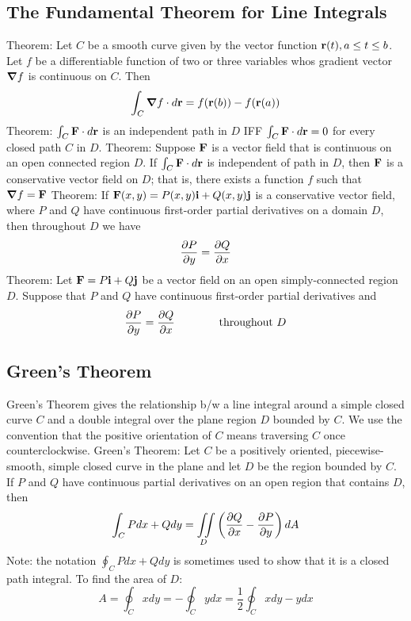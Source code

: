 \documentclass{article}
\begin{document}
    \subsection{The Fundamental Theorem for Line Integrals}
    \begin{outline}
        \1 Theorem: Let $C$ be a smooth curve given by the vector function \(\vb r(t),a\leq t\leq b\). Let $f$ be a differentiable function of two or three variables whos gradient vector \(\grad f\) is continuous on $C$. Then \[\int_C\grad f\cdot d\vb r=f(\vb r(b))-f(\vb r(a))\]
        \1 Theorem: \(\int_C\vb F\cdot d\vb r\) is an independent path in $D$ IFF \(\int_C\vb F\cdot d\vb r=0\) for every closed path $C$ in $D$. 
        \1 Theorem: Suppose \(\vb F\) is a vector field that is continuous on an open connected region $D$. If \(\int_C\vb F\cdot d\vb r\) is independent of path in $D$, then \(\vb F\) is a conservative vector field on $D$; that is, there exists a function $f$ such that \(\grad f=\vb F\)
        \1 Theorem: If \(\vb F(x,y)=P(x,y)\vb i+Q(x,y)\vb j\) is a conservative vector field, where $P$ and $Q$ have continuous first-order partial derivatives on a domain $D$, then throughout $D$ we have \[\pdv{P}{y}=\pdv{Q}{x}\]
        \1 Theorem: Let \(\vb F=P\vb i+Q\vb j\) be a vector field on an open simply-connected region $D$. Suppose that \(P\) and $Q$ have continuous first-order partial derivatives and \[\pdv{P}{y}=\pdv{Q}{x}\qquad\qquad\text{throughout }D\]
    \end{outline}
    \subsection{Green's Theorem}
    \begin{outline}
        \1 Green's Theorem gives the relationship b/w a line integral around a simple closed curve $C$ and a double integral over the plane region $D$ bounded by $C$. 
        \1 We use the convention that the positive orientation of $C$ means traversing $C$ once counterclockwise. 
        \1 Green's Theorem: Let $C$ be a positively oriented, piecewise-smooth, simple closed curve in the plane and let $D$ be the region bounded by $C$. If $P$ and $Q$ have continuous partial derivatives on an open region that contains $D$, then \[\int_CPdx+Qdy=\iint\limits_D\left(\pdv{Q}{x}-\pdv{P}{y}\right)dA\]
            \2 Note: the notation \(\oint_CPdx+Qdy\) is sometimes used to show that it is a closed path integral. 
        \1 To find the area of $D$: \[A=\oint_Cxdy=-\oint_Cydx=\dfrac{1}{2}\oint_Cxdy-ydx\]

    \end{outline}
\end{document}
